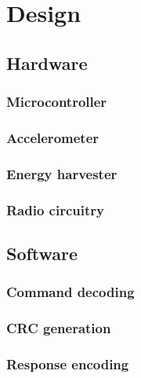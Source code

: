 \section{Design}

\subsection{Hardware}

\subsubsection{Microcontroller}
\subsubsection{Accelerometer}
\subsubsection{Energy harvester}
\subsubsection{Radio circuitry}

\subsection{Software}

\subsubsection{Command decoding}
\subsubsection{CRC generation}
\subsubsection{Response encoding}
